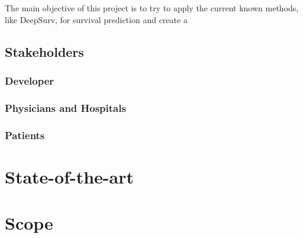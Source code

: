 \documentclass[a4paper]{article}
\begin{document}
The main objective of this project is to try to apply the current known methods, like DeepSurv, 
for survival prediction and create a 

\subsection{Stakeholders}

\subsubsection{Developer}
\subsubsection{Physicians and Hospitals}
\subsubsection{Patients}

\section{State-of-the-art}

\section{Scope}

\pagebreak
\printbibliography{}
\end{document}
